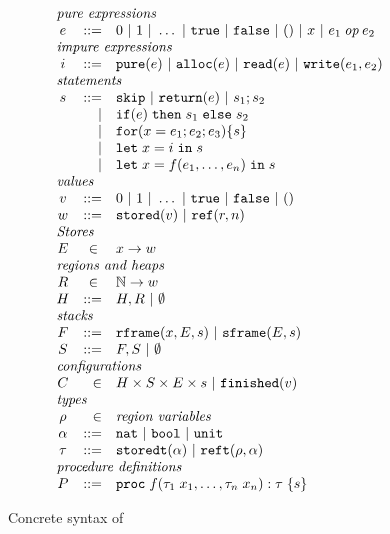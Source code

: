 \newcommand{\syntaxtitle}[1]{\multicolumn{3}{l}{\textit{#1}}}
\begin{figure}[t]

\[
\begin{array}{crl}
\syntaxtitle{pure expressions}\\
e & ::= & 0 \sep{} 1 \sep{} \ldots{} \sep{} \texttt{true} \sep{} \texttt{false} \sep{} () \sep{} x \sep{} 
          e_1 \mathbin{\mathit{op}} e_2 \\
\syntaxtitle{impure expressions}\\
i & ::= & \texttt{pure}(e) \sep{} \texttt{alloc}(e) \sep{}
          \texttt{read}(e) \sep{} \texttt{write}(e_1, e_2)\\
\syntaxtitle{statements}\\
s & ::= & \texttt{skip} \sep{} \texttt{return}(e) \sep{} s_1; s_2 \\ 
  & |   & \texttt{if}(e)\texttt{\;then\;} s_1 \texttt{\;else\;} s_2 \\
  & |   & \texttt{for}(x = e_1; e_2; e_3) \{ s \} \\
  & |   & \texttt{let\;} x = i \texttt{\;in\;} s \\
  & |   & \texttt{let\;} x = f(e_1, \ldots{}, e_n) \texttt{\;in\;} s \\
\syntaxtitle{values}\\
v & ::= & 0 \sep{} 1 \sep{} \ldots{} \sep{} \texttt{true} \sep{} \texttt{false} \sep{} () \\
w & ::= & \texttt{stored}(v) \sep{} \texttt{ref}(r, n) \\
\syntaxtitle{Stores}\\
E & \in{} & x \to w \\
\syntaxtitle{regions and heaps}\\
R & \in{} & \mathbb{N} \to w\\
H & ::=   & H, R \sep{} \emptyset{}\\
\syntaxtitle{stacks}\\
F & ::= & \texttt{rframe}(x, E, s) \sep{} \texttt{sframe}(E, s) \\
S & ::= & F, S \sep{} \emptyset{} \\
\syntaxtitle{configurations}\\
C & \in & H \times S \times E \times s \sep{} \texttt{finished}(v) \\
\syntaxtitle{types}\\
\rho   & \in & \textit{region variables}\\
\alpha & ::= & \texttt{nat} \sep{} \texttt{bool} \sep{} \texttt{unit} \\
\tau   & ::= & \texttt{storedt}(\alpha) \sep{} \texttt{reft}(\rho, \alpha) \\
\syntaxtitle{procedure definitions}\\
P & ::= & \texttt{proc\;} f(\tau_1\;x_1, \ldots{}, \tau_n\;x_n) : \tau\; \{ s \}
\end{array}
\]


\label{fig:syntax}
\caption{Concrete syntax of \coreivory{}}
\end{figure}

